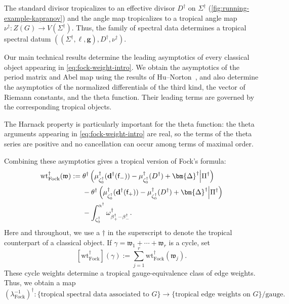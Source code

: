 \documentclass[12pt]{amsart}
\numberwithin{equation}{section}
\theoremstyle{definition}
\def\Gtor{G}
\def\vertices{V}
\newcommand{\wt}{\mathrm{wt}}
\def\divisor{D}
\def\trop{\dagger}
\def\bface{\mathsf{f}}
\def\dam{{\bf d}}
\def\zzG{{{Z}(G)}}
\def\divisor{D}
\def\vecRC{\bm{\Delta}}
\def\ptSig{\zeta}
\def\baseptT{{\ptSig_0^\trop}}
\def\mcurve{\Sigma}
\def\tropmcurve{\mcurve^\trop}
\begin{document}
The standard divisor tropicalizes to an effective divisor
$
\divisor^\trop
$
on $\tropmcurve$ (\cref{fig:running-example-kapranov}) and the angle map tropicalizes to a tropical angle map
$
\nu^\trop:\zzG\rightarrow\vertices(\tropmcurve).
$
Thus, the family of spectral data determines a tropical spectral datum
$
(
(\tropmcurve,\ell,\bm g),
\divisor^\trop,
\nu^\trop
).
$





Our main technical results determine the leading asymptotics of every
classical object appearing in \eqref{eq:fock-weight-intro}. We obtain
the asymptotics of the period matrix and Abel map using the results of
Hu--Norton~\cite{HuNorton}, and also determine the asymptotics of the
normalized differentials of the third kind, the vector of Riemann
constants, and the theta function. Their leading terms are governed by
the corresponding tropical objects.

The Harnack property is particularly important for the theta function:
the theta arguments appearing in \eqref{eq:fock-weight-intro} are real,
so the terms of the theta series are positive and no cancellation can
occur among terms of maximal order.

Combining these asymptotics gives a tropical version of Fock's formula:
\[
\begin{aligned}
\wt_{\mathrm{Fock}}^\trop(\mathfrak w)
:={}&
\theta^\trop\left(
\mu_{\baseptT}^{\trop}
    (\dam^\trop(\bface_-))
-\mu_{\baseptT}^{\trop}
    (\divisor^\trop)
+\vecRC^{\trop}
\middle|
\Pi^{\trop}
\right)
\\
&-
\theta^\trop\left(
\mu_{\baseptT}^{\trop}
    (\dam^\trop(\bface_+))
-\mu_{\baseptT}^{\trop}
    (\divisor^\trop)
+\vecRC^{\trop}
\middle|
\Pi^{\trop}
\right)
\\
&-
\int_{\baseptT}^{\alpha^\trop}
\omega_{\beta_+^\trop-\beta_-^\trop}^\trop.
\end{aligned}
\]
Here and throughout, we use a $\dagger$ in the superscript to denote the tropical counterpart of a classical object. If
$
\gamma=\mathfrak w_1+\cdots+\mathfrak w_r
$
is a cycle, set
\begin{equation}
\label{eq:tropical-fock-weight-intro}
[\wt_{\mathrm{Fock}}^\trop](\gamma)
:=
\sum_{j=1}^r
\wt_{\mathrm{Fock}}^\trop(\mathfrak w_j).
\end{equation}
These cycle weights determine a tropical gauge-equivalence class of
edge weights. Thus, we obtain a map
\[
(\lambda^{-1}_{\mathrm{Fock}})^\trop:
\{
\text{tropical spectral data associated to $\Gtor$}
\}
\rightarrow
\{
\text{tropical edge weights on $\Gtor$}
\}/\text{gauge}.
\]
\end{document}
